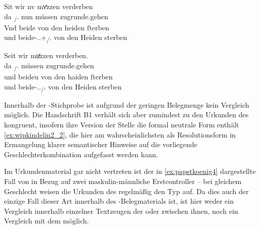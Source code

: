 \begin{exe}
\ex \label{ex:wipkindelin2}
	\begin{xlist}
	\ex \label{ex:wipkindelin2_1}
		\begin{taggedline}{\parencite[\pno~5rb,33--34]{kc:VB}}
		\gll Sit wír nv mvͤzzen verderben \\
			da \Fpl\textsubscript{\SF/\SX}.\Nom{} nun müssen zugrunde.gehen \\
	\sn \gll Vnd beide von den heiden ſterben \\
			und beide-\Nom.\Pl.\M+\F\textsubscript{\SF/\SX}.\St{} von den Heiden
				sterben \\
		\end{taggedline}
		
	\ex \label{ex:wipkindelin2_2}
		\gll Seit wir muͤzzen verderben. \\
			da \Fpl\textsubscript{\SF/\SX}.\Nom{} müssen zugrunde.gehen \\
	\sn \gll und beideu von den haiden ſterben \\
			und beide-\Nom.\Pl.\N\textsubscript{\SF/\SX}.\St{} von den Heiden
				sterben \\
		\begin{taggedline}{\parencites[\pno~4vb,57--58]{kc:B1}[vgl. abweichend][931--932]{schroeder1895}}
		\trans {}
		\end{taggedline}
	\end{xlist}
\end{exe}

Innerhalb der \KC{}-Stichprobe ist aufgrund der geringen Belegmenge
kein Vergleich möglich. Die Handschrift B1 verhält sich aber
zumindest zu den Urkunden des \CAO{} kongruent, insofern ihre Version
der Stelle die formal neutrale Form  enthält
\cref{ex:wipkindelin2_2}, die hier am wahrscheinlichsten als Resolutionsform in
Ermangelung klarer semantischer Hinweise auf die vorliegende
Geschlechterkombination aufgefasst werden kann.

Im Urkundenmaterial gar nicht vertreten ist der in \cref{ex:papstkoenig4}
dargestellte Fall von  in Bezug auf zwei maskulin-männliche
Erstcontroller -- bei gleichem Geschlecht weisen die Urkunden des
\CAO{} regelmäßig den Typ  auf. Da dies auch der einzige
Fall dieser Art innerhalb des \KC{}-Belegmaterials ist, ist hier weder
ein Vergleich innerhalb einzelner Textzeugen der \KC{} oder zwischen
ihnen, noch ein Vergleich mit dem \CAO{} möglich.

